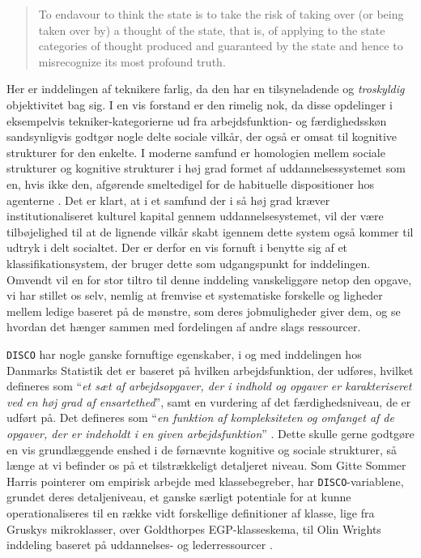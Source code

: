 %
 \begin{quote} \small %
	To endavour to think the state is to take the risk of taking over (or being taken over by) a thought of the state, that is, of applying to the state categories of thought produced and 	guaranteed by the state and hence to misrecognize its most profound truth. 
 \end{quote}
Her er inddelingen af teknikere farlig, da den har en tilsyneladende og \emph{troskyldig} objektivitet bag sig. I en vis forstand er den rimelig nok, da disse opdelinger i eksempelvis tekniker-kategorierne ud fra arbejdsfunktion- og færdighedsskøn sandsynligvis godtgør nogle delte sociale vilkår, der også er omsat til kognitive strukturer for den enkelte. I moderne samfund er homologien mellem sociale strukturer og kognitive strukturer i høj grad formet af uddannelsessystemet som en, hvis ikke den, afgørende smeltedigel for de habituelle dispositioner hos agenterne \parencite[12]{Bourdieu1992}. Det er klart, at i et samfund der i så høj grad kræver institutionaliseret kulturel kapital gennem uddannelsesystemet, vil der være tilbøjelighed til at de lignende vilkår skabt igennem dette system også kommer til udtryk i delt socialtet. Der er derfor en vis fornuft i benytte sig af et klassifikationsystem, der bruger dette som udgangspunkt for inddelingen. Omvendt vil en for stor tiltro til denne inddeling vanskeliggøre netop den opgave, vi har stillet os selv, nemlig at fremvise et systematiske forskelle og ligheder mellem ledige baseret på de mønstre, som deres jobmuligheder giver dem, og se hvordan det hænger sammen med fordelingen af andre slags ressourcer. 

\texttt{DISCO} har nogle ganske fornuftige egenskaber, i og med inddelingen hos Danmarks Statistik det er baseret på hvilken arbejdsfunktion, der udføres, hvilket defineres som “\emph{et sæt af arbejdsopgaver, der i indhold og opgaver er karakteriseret ved en høj grad af ensartethed}”, samt en vurdering af det færdighedsniveau, de er udført på. Det defineres som “\emph{en funktion af kompleksiteten og omfanget af de opgaver, der er indeholdt i en given arbejdsfunktion}” \parencite[7]{Ploug2011}. Dette skulle gerne godtgøre en vis grundlæggende enshed i de førnævnte kognitive og sociale strukturer, så længe at vi befinder os på et tilstrækkeligt detaljeret niveau. Som Gitte Sommer Harris pointerer om empirisk arbejde med klassebegreber, har \texttt{DISCO}-variablene, grundet deres detaljeniveau, et ganske særligt potentiale for at kunne operationaliseres til en række vidt forskellige definitioner af klasse, lige fra Gruskys mikroklasser, over Goldthorpes EGP-klasseskema, til Olin Wrights inddeling baseret på uddannelses- og lederressourcer \parencite[172]{Harrits2014}. 


